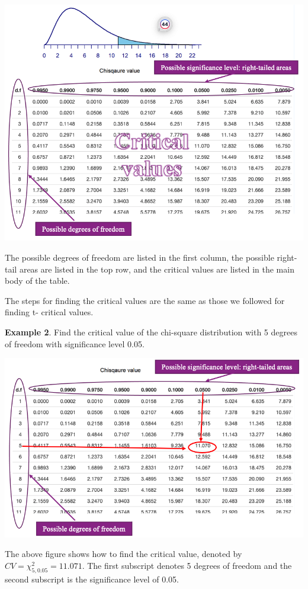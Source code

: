 \documentclass[
]{book}
\begin{document}
\begin{center}\includegraphics[width=0.8\linewidth]{week13/chisqTable} \end{center}

The possible degrees of freedom are listed in the first column, the possible right-tail areas are listed in the top row, and the critical values are listed in the main body of the table.

The steps for finding the critical values are the same as those we followed for finding t- critical values.

\textbf{Example 2}. Find the critical value of the chi-square distribution with 5 degrees of freedom with significance level 0.05.

\begin{center}\includegraphics[width=0.8\linewidth]{week13/example02ChisqCV} \end{center}

The above figure shows how to find the critical value, denoted by \(CV = \chi^2_{5, 0.05} = 11.071\). The first subscript denotes 5 degrees of freedom and the second subscript is the significance level of 0.05.
\end{document}
